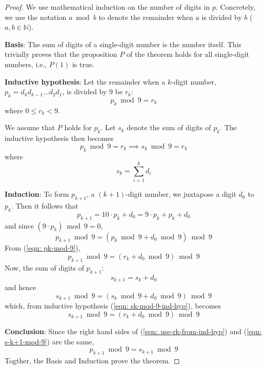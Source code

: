 \documentclass[a4paper]{article}
\begin{document}
\begin{proof}
    We use mathematical induction on the number of digits in $p$. Concretely, we use the notation $a \bmod b$ to denote the remainder when $a$ is divided by $b$ ($a, b \in \mathbb{N}$). 

    \textbf{Basis}: The sum of digits of a single-digit number is the number itself. This trivially proves that the proposition $P$ of the theorem holds for all single-digit numbers, i.e., $P(1)$ is true. 

    \textbf{Inductive hypothesis}: Let the remainder when a $k$-digit number, 
    $
        p_k = d_{k}d_{k-1}\dots d_{2}d_{1} 
    $,
    is divided by $9$ be $r_k$:
    \begin{equation}
        \label{eqn: pk-mod-9}
        p_k \bmod 9 = r_k
    \end{equation}
    where $0 \le r_k < 9$.
    

    We assume that $P$ holds for $p_k$. Let $s_k$ denote the sum of digits of $p_k$. The inductive hypothesis then becomes
    \begin{equation}
        \label{eqn: sk-mod-9-ind-hyp}
        p_k \bmod 9 = r_k \implies s_k \bmod 9 = r_k
    \end{equation}
    where
    $$
        s_k = \sum_{i=1}^{k} d_i
    $$

    \textbf{Induction}: To form $p_{k+1}$, a $(k+1)$-digit number, we juxtapose a digit $d_0$ to $p_k$. Then it follows that 
    $$
        p_{k+1} = 10\cdot p_k + d_0 = 9\cdot p_k + p_k + d_0
    $$
    and since $(9\cdot p_k) \bmod 9 = 0$,
    \begin{equation}
        \label{eqn: p-k+1-mod-9}
        p_{k+1} \bmod 9 = (p_k \bmod 9 + d_0 \bmod 9) \bmod 9
    \end{equation}
    From (\ref{eqn: pk-mod-9}), 
    \begin{equation}
        \label{eqn: use-rk-from-ind-hyp}
        p_{k+1} \bmod 9 = (r_k + d_0 \bmod 9) \bmod 9
    \end{equation}
    Now, the sum of digits of $p_{k+1}$: 
    \begin{equation}
        \label{eqn: sk+1-definition}
        s_{k+1} = s_k + d_0
    \end{equation}
    and hence
    $$
        s_{k+1} \bmod 9 = (s_k \bmod 9 + d_0 \bmod 9) \bmod 9
    $$
    which, from inductive hypothesis (\ref{eqn: sk-mod-9-ind-hyp}), becomes
    \begin{equation}
        \label{eqn: s-k+1-mod-9}
        s_{k+1} \bmod 9 = (r_k + d_0 \bmod 9) \bmod 9
    \end{equation}

    \textbf{Conclusion}: Since the right hand sides of (\ref{eqn: use-rk-from-ind-hyp}) and (\ref{eqn: s-k+1-mod-9}) are the same, 
    $$
        p_{k+1} \bmod 9 = s_{k+1} \bmod 9
    $$
    Togther, the Basis and Induction prove the theorem.
\end{proof}
\end{document}
